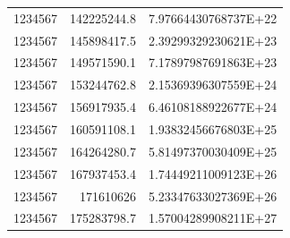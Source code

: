 \begin{center}
\begin{longtable}{lrr}
1234567 & 142225244.8 & 7.97664430768737E+22 \\
1234567 & 145898417.5 & 2.39299329230621E+23 \\
1234567 & 149571590.1 & 7.17897987691863E+23 \\
1234567 & 153244762.8 & 2.15369396307559E+24 \\
1234567 & 156917935.4 & 6.46108188922677E+24 \\
1234567 & 160591108.1 & 1.93832456676803E+25 \\
1234567 & 164264280.7 & 5.81497370030409E+25 \\
1234567 & 167937453.4 & 1.74449211009123E+26 \\
1234567 & 171610626 & 5.23347633027369E+26 \\
1234567 & 175283798.7 & 1.57004289908211E+27 \\
\end{longtable}
\end{center}

